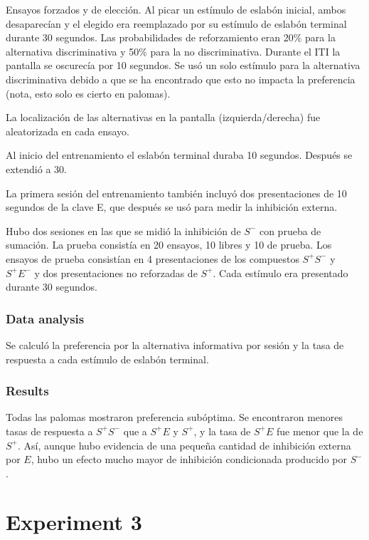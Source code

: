 \documentclass[a4paper,12pt]{article}
\begin{document}
Ensayos forzados y de elección.
Al picar un estímulo de eslabón inicial, ambos desaparecían y el elegido era reemplazado por su estímulo de eslabón terminal durante 30 segundos.
Las probabilidades de reforzamiento eran 20\% para la alternativa discriminativa y 50\% para la no discriminativa.
Durante el ITI la pantalla se oscurecía por 10 segundos.
Se usó un solo estímulo para la alternativa discriminativa debido a que se ha encontrado que esto no impacta la preferencia (nota, esto solo es cierto en palomas).

La localización de las alternativas en la pantalla (izquierda/derecha) fue aleatorizada en cada ensayo.

Al inicio del entrenamiento el eslabón terminal duraba 10 segundos. Después se extendió a 30.

La primera sesión del entrenamiento también incluyó dos presentaciones de 10 segundos de la clave E, que después se usó para medir la inhibición externa.

Hubo dos sesiones en las que se midió la inhibición de $S^{-}$ con prueba de sumación.
La prueba consistía en 20 ensayos, 10 libres y 10 de prueba.
Los ensayos de prueba consistían en 4 presentaciones de los compuestos $S^{+}S^{-}$ y $S^{+}E^{-}$ y dos presentaciones no reforzadas de $S^{+}$.
Cada estímulo era presentado durante 30 segundos.


\subsubsection{Data analysis}

Se calculó la preferencia por la alternativa informativa por sesión y la tasa de respuesta a cada estímulo de eslabón terminal.

\subsubsection{Results}

Todas las palomas mostraron preferencia subóptima.
Se encontraron menores tasas de respuesta a $S^{+}S^{-}$ que a $S^{+}E$ y $S^{+}$, y la tasa de $S^{+}E$ fue menor que la de $S^{+}$.
Así, aunque hubo evidencia de una pequeña cantidad de inhibición externa por $E$, hubo un efecto mucho mayor de inhibición condicionada producido por $S^{-}$.

\section{Experiment 3}
\end{document}
